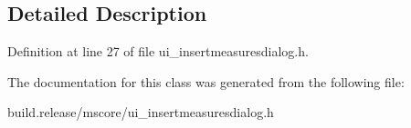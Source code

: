 \subsection{Detailed Description}


Definition at line 27 of file ui\+\_\+insertmeasuresdialog.\+h.



The documentation for this class was generated from the following file\+:\begin{DoxyCompactItemize}
\item 
build.\+release/mscore/ui\+\_\+insertmeasuresdialog.\+h\end{DoxyCompactItemize}
